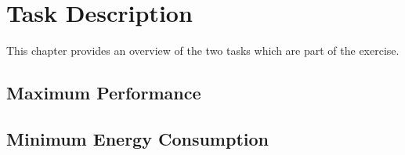\chapter{Task Description}
\label{cha:task}
	This chapter provides an overview of the two tasks which are part of the exercise.

	\section{Maximum Performance} %
	\label{sec:task_max_perf}
		

	\section{Minimum Energy Consumption} %
	\label{sec:task_min_energy}
		

